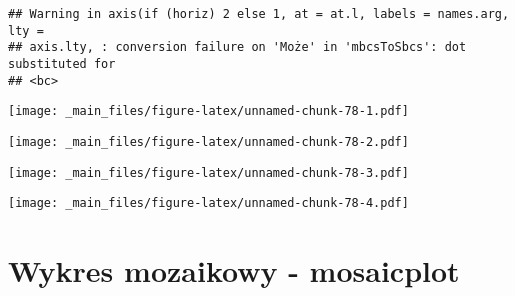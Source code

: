 \documentclass[
]{book}
\newenvironment{Shaded}{\begin{snugshade}}{\end{snugshade}}
\newcommand{\AttributeTok}[1]{\textcolor[rgb]{0.77,0.63,0.00}{#1}}
\newcommand{\ConstantTok}[1]{\textcolor[rgb]{0.00,0.00,0.00}{#1}}
\newcommand{\FunctionTok}[1]{\textcolor[rgb]{0.00,0.00,0.00}{#1}}
\newcommand{\NormalTok}[1]{#1}
\newcommand{\SpecialCharTok}[1]{\textcolor[rgb]{0.00,0.00,0.00}{#1}}
\newcommand{\StringTok}[1]{\textcolor[rgb]{0.31,0.60,0.02}{#1}}
\begin{document}
\begin{verbatim}
## Warning in axis(if (horiz) 2 else 1, at = at.l, labels = names.arg, lty =
## axis.lty, : conversion failure on 'Może' in 'mbcsToSbcs': dot substituted for
## <bc>
\end{verbatim}

\texttt{[image: \_main\_files/figure-latex/unnamed-chunk-78-1.pdf]}

\begin{Shaded}
\end{Shaded}

\texttt{[image: \_main\_files/figure-latex/unnamed-chunk-78-2.pdf]}

\begin{Shaded}
\end{Shaded}

\texttt{[image: \_main\_files/figure-latex/unnamed-chunk-78-3.pdf]}

\begin{Shaded}
\end{Shaded}

\texttt{[image: \_main\_files/figure-latex/unnamed-chunk-78-4.pdf]}

\hypertarget{wykres-mozaikowy---mosaicplot}{%
\section{Wykres mozaikowy - mosaicplot}\label{wykres-mozaikowy---mosaicplot}}
\end{document}
